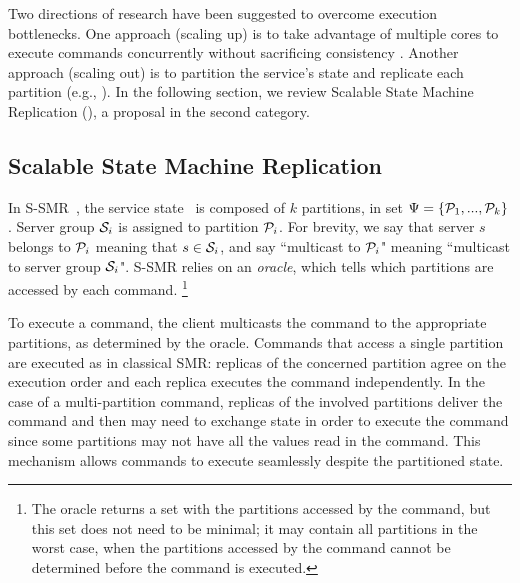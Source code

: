 Two directions of research have been suggested to overcome execution bottlenecks. One approach (scaling up) is to take advantage of multiple cores to execute commands concurrently without sacrificing consistency \cite{Kapritsos:2012um,Marandi:2014bj,Kotla:2004ep,Guo:2014jp}. Another approach (scaling out) is to partition the service's state and replicate each partition (e.g., \cite{Glendenning:2011kj,Marandi:2011dj}). In the following section, we review Scalable State Machine Replication (\ssmr), a proposal in the second category.

\subsection{Scalable State Machine Replication}
\label{sec:ssmr}

In S-SMR~\cite{bezerra2014ssmr}, the service state \vvt\ is composed of $k$ partitions, in set $\Psi = \{\mathcal{P}_1, ..., \mathcal{P}_k\}$. Server group $\mathcal{S}_i$ is assigned to partition $\mathcal{P}_i$. For brevity, we say that server $s$ belongs to $\mathcal{P}_i$ meaning that $s \in \mathcal{S}_i$, and say ``multicast to $\mathcal{P}_i$" meaning ``multicast to server group $\mathcal{S}_i$".
S-SMR relies on an \emph{oracle}, which tells which partitions are accessed by each command.%
\footnote{The oracle returns a set with the partitions accessed by the command, but this set does not need to be minimal; it may contain all partitions in the worst case, when the partitions accessed by the command cannot be determined before the command is executed.}

To execute a command, the client multicasts the command to the appropriate partitions, as determined by the oracle.
Commands that access a single partition are executed as in classical SMR: replicas of the concerned partition agree on the execution order and each replica executes the command independently.
In the case of a multi-partition command, replicas of the involved partitions deliver the command and then may need to exchange state in order to execute the command since some partitions may not have all the values read in the command.
This mechanism allows commands to execute seamlessly despite the partitioned state.

%


